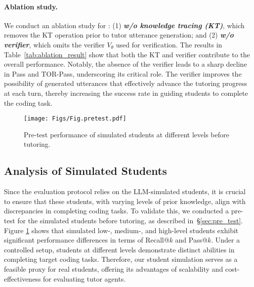 \paragraph{Ablation study.}
We conduct an ablation study for \model: (1) \textit{\textbf{w/o knowledge tracing (KT)}}, which removes the KT operation prior to tutor utterance generation; and (2) \textit{\textbf{w/o verifier}}, which omits the verifier $V_{\theta}$ used for verification. 
The results in Table~\ref{tab:ablation_result} show that both the KT and verifier contribute to the overall performance. 
Notably, the absence of the verifier leads to a sharp decline in Pass and TOR-Pass, underscoring its critical role. 
The verifier improves the possibility of generated utterances that effectively advance the tutoring progress at each turn, thereby increasing the success rate in guiding students to complete the coding task.

\begin{figure}[t!]
\centering
\texttt{[image: Figs/Fig.pretest.pdf]}
\caption{Pre-test performance of simulated students at different levels before tutoring.}
\label{fig:pretest_result}
\vspace{-4pt}
\end{figure}



\subsection{Analysis of Simulated Students}
\label{sec:student_analysis}

Since the \eval evaluation protocol relies on the LLM-simulated students, it is crucial to ensure that these students, with varying levels of prior knowledge, align with discrepancies in completing coding tasks. To validate this, we conducted a pre-test for the simulated students before tutoring, as described in~\S\ref{sec:pre_test}. Figure \ref{fig:pretest_result} shows that simulated low-, medium-, and high-level students exhibit significant performance differences in terms of Recall@$k$ and Pass@$k$. Under a controlled setup, students at different levels demonstrate distinct abilities in completing target coding tasks. Therefore, our student simulation serves as a feasible proxy for real students, offering its advantages of scalability and cost-effectiveness for evaluating tutor agents.


